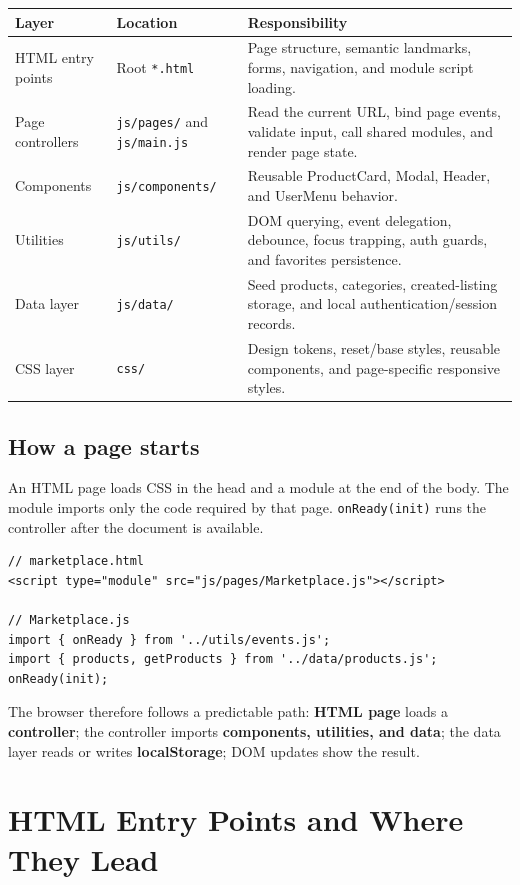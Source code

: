\documentclass[10pt]{article}
\newcommand{\code}[1]{\texttt{#1}}
\begin{document}
\begin{tabular}{@{}p{3.0cm}p{4.1cm}p{6.2cm}@{}}
\toprule
\textbf{Layer} & \textbf{Location} & \textbf{Responsibility} \\
\midrule
HTML entry points & Root \code{*.html} & Page structure, semantic landmarks, forms, navigation, and module script loading. \\
Page controllers & \code{js/pages/} and \code{js/main.js} & Read the current URL, bind page events, validate input, call shared modules, and render page state. \\
Components & \code{js/components/} & Reusable ProductCard, Modal, Header, and UserMenu behavior. \\
Utilities & \code{js/utils/} & DOM querying, event delegation, debounce, focus trapping, auth guards, and favorites persistence. \\
Data layer & \code{js/data/} & Seed products, categories, created-listing storage, and local authentication/session records. \\
CSS layer & \code{css/} & Design tokens, reset/base styles, reusable components, and page-specific responsive styles. \\
\bottomrule
\end{tabular}

\subsection{How a page starts}

An HTML page loads CSS in the head and a module at the end of the body. The module imports only the code required by that page. \code{onReady(init)} runs the controller after the document is available.

\begin{lstlisting}
// marketplace.html
<script type="module" src="js/pages/Marketplace.js"></script>

// Marketplace.js
import { onReady } from '../utils/events.js';
import { products, getProducts } from '../data/products.js';
onReady(init);
\end{lstlisting}

The browser therefore follows a predictable path: \textbf{HTML page} loads a \textbf{controller}; the controller imports \textbf{components, utilities, and data}; the data layer reads or writes \textbf{localStorage}; DOM updates show the result.

\clearpage
\section{HTML Entry Points and Where They Lead}
\end{document}
